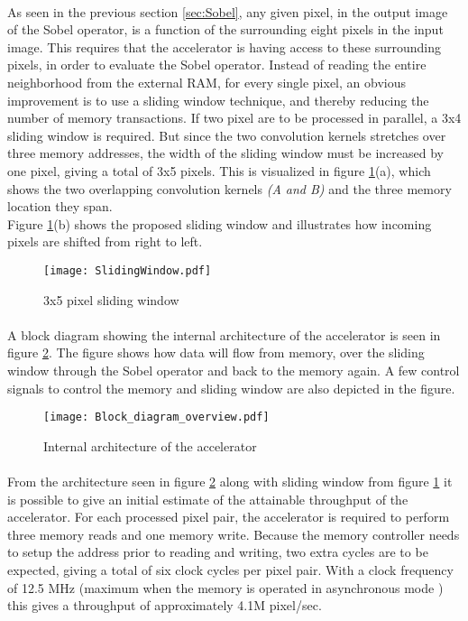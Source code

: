 \paragraph*{}
As seen in the previous section \ref{sec:Sobel}, any given pixel, in the output image of the Sobel operator, is a function of the surrounding eight pixels in the input image. This requires that the accelerator is having access to these surrounding pixels, in order to evaluate the Sobel operator. Instead of reading the entire neighborhood from the external RAM, for every single pixel, an obvious improvement is to use a sliding window technique, and thereby reducing the number of memory transactions. If two pixel are to be processed in parallel, a 3x4 sliding window is required. But since the two convolution kernels stretches over three memory addresses, the width of the sliding window must be increased by one pixel, giving a total of 3x5 pixels. This is visualized in figure \ref{fig:shift_register}(a), which shows the two overlapping convolution kernels \emph{(A and B)} and the three memory location they span. \\
Figure \ref{fig:shift_register}(b) shows the proposed sliding window and illustrates how incoming pixels are shifted from right to left.

\begin{figure}[H]
	\centering
	\texttt{[image: SlidingWindow.pdf]}
	\caption{3x5 pixel sliding window}
	\label{fig:shift_register}
\end{figure}

\paragraph*{}
A block diagram showing the internal architecture of the accelerator is seen in figure \ref{fig:AccBlockDiagram}. The figure shows how data will flow from memory, over the sliding window through the Sobel operator and back to the memory again. A few control signals to control the memory and sliding window are also depicted in the figure. 

\begin{figure}[H]
	\centering
	\texttt{[image: Block\_diagram\_overview.pdf]}
	\caption{Internal architecture of the accelerator}
	\label{fig:AccBlockDiagram}
\end{figure}

\paragraph*{}
From the architecture seen in figure \ref{fig:AccBlockDiagram} along with sliding window from figure \ref{fig:shift_register} it is possible to give an initial estimate of the attainable throughput of the accelerator. For each processed pixel pair, the accelerator is required to perform three memory reads and one memory write. Because the memory controller needs to setup the address prior to reading and writing, two extra cycles are to be expected, giving a total of six clock cycles per pixel pair.
With a clock frequency of 12.5 MHz (maximum when the memory is operated in asynchronous mode \cite{Micron:CellularRAM}) this gives a throughput of approximately 4.1M pixel/sec.

